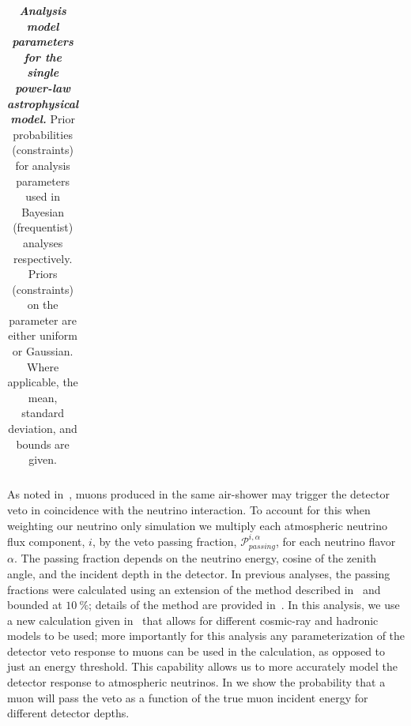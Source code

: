 \begin{table}[thb]
\begin{minipage}{\linewidth}
\begin{tabular}{l rrr}
		\end{tabular}
	\end{minipage}
	\begin{minipage}{\linewidth}
		\internallinenumbers
		\caption{\textbf{\textit{Analysis model parameters for the single power-law astrophysical model.}} Prior probabilities (constraints) for analysis parameters used in Bayesian (frequentist) analyses respectively.
			Priors (constraints) on the parameter are either uniform or Gaussian.
			Where applicable, the mean, standard deviation, and bounds are given.}\vspace{-6mm}\label{tbl:priors}
	\end{minipage}
\end{table}

As noted in~\cite{Schonert:2008is}, muons produced in the same air-shower may trigger the detector veto in coincidence with the neutrino interaction.
To account for this when weighting our neutrino only simulation we multiply each atmospheric neutrino flux component, $i$, by the veto passing fraction, $\mathcal{P}^{i,\alpha}_{passing}$, for each neutrino flavor $\alpha$.
The passing fraction depends on the neutrino energy, cosine of the zenith angle, and the incident depth in the detector.
In previous analyses, the passing fractions were calculated using an extension of the method described in~\cite{Schonert:2008is} and bounded at $\SI{10}\percent$; details of the method are provided in~\cite{Aartsen:2013jdh}.
In this analysis, we use a new calculation given in~\cite{Arguelles:2018awr} that allows for different cosmic-ray and hadronic models to be used; more importantly for this analysis any parameterization of the detector veto response to muons can be used in the calculation, as opposed to just an energy threshold.
This capability allows us to more accurately model the detector response to atmospheric neutrinos.
In  we show the probability that a muon will pass the veto as a function of the true muon incident energy for different detector depths.

